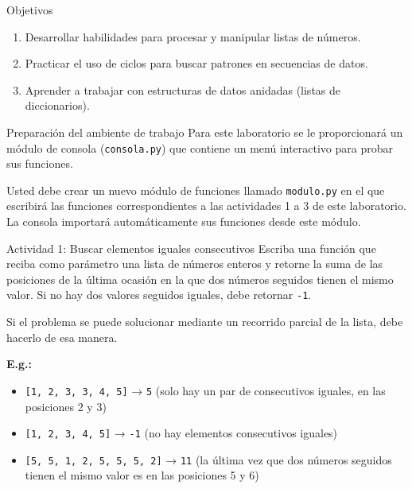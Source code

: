 \documentclass{ip-lab}
\begin{document}
\maketitle

\begin{sectionbox}{Objetivos}
\begin{enumerate}
    \item Desarrollar habilidades para procesar y manipular listas de números.
    \item Practicar el uso de ciclos para buscar patrones en secuencias de datos.
    \item Aprender a trabajar con estructuras de datos anidadas (listas de diccionarios).
\end{enumerate}
\end{sectionbox}


\begin{sectionbox}{Preparación del ambiente de trabajo}
  Para este laboratorio se le proporcionará un módulo de consola (\texttt{consola.py}) que contiene un menú interactivo para probar sus funciones.
  
  Usted debe crear un nuevo módulo de funciones llamado \texttt{modulo.py} en el que escribirá las funciones correspondientes a las actividades 1 a 3 de este laboratorio. La consola importará automáticamente sus funciones desde este módulo.
\end{sectionbox}


\begin{sectionbox}{Actividad 1: Buscar elementos iguales consecutivos}
  Escriba una función que reciba como parámetro una lista de números enteros y retorne la suma de las posiciones de la última ocasión en la que dos números seguidos tienen el mismo valor. Si no hay dos valores seguidos iguales, debe retornar \texttt{-1}.

  Si el problema se puede solucionar mediante un recorrido parcial de la lista, debe hacerlo de esa manera.

  \textbf{E.g.:}
  \begin{itemize}
      \item \texttt{[1, 2, 3, 3, 4, 5]} → \texttt{5} (solo hay un par de consecutivos iguales, en las posiciones 2 y 3)
      \item \texttt{[1, 2, 3, 4, 5]} → \texttt{-1} (no hay elementos consecutivos iguales)
      \item \texttt{[5, 5, 1, 2, 5, 5, 5, 2]} → \texttt{11} (la última vez que dos números seguidos tienen el mismo valor es en las posiciones 5 y 6)
  \end{itemize}
\end{sectionbox}
\end{document}
